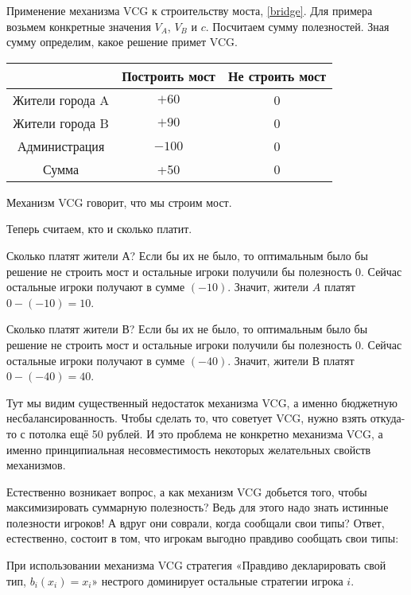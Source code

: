 \begin{myex}
Применение механизма VCG к строительству моста, \ref{bridge}. Для примера возьмем конкретные значения $ V_{A} $, $ V_{B} $ и $ c $. Посчитаем сумму полезностей. Зная сумму определим, какое решение примет VCG.

\begin{tabular}{c|cc}
& Построить мост & Не строить мост \\
\hline
Жители города A & $ +60 $ & 0 \\
Жители города B & $ +90 $ & 0 \\
Администрация & $-100 $ & 0 \\
Сумма & +50 & 0 \\
\end{tabular}

Механизм VCG говорит, что мы строим мост.

Теперь считаем, кто и сколько платит.

Сколько платят жители А? Если бы их не было, то оптимальным было бы решение не строить мост и остальные игроки получили бы полезность 0. Сейчас остальные игроки получают в сумме $ (-10) $. Значит, жители $ A $ платят $ 0-(-10)=10 $.

Сколько платят жители В? Если бы их не было, то оптимальным было бы решение не строить мост и остальные игроки получили бы полезность 0. Сейчас остальные игроки получают в сумме $ (-40) $. Значит, жители В платят $ 0-(-40)=40 $.

Тут мы видим существенный недостаток механизма VCG, а именно бюджетную несбалансированность. Чтобы сделать то, что советует VCG, нужно взять откуда-то с потолка ещё 50 рублей. И это проблема не конкретно механизма VCG, а именно принципиальная несовместимость некоторых желательных свойств механизмов.
\end{myex}

Естественно возникает вопрос, а как механизм VCG добьется того, чтобы максимизировать суммарную полезность? Ведь для этого надо знать истинные полезности игроков! А вдруг они соврали, когда сообщали свои типы? Ответ, естественно, состоит в том, что игрокам выгодно правдиво сообщать свои типы:

\begin{myth}
При использовании механизма VCG стратегия «Правдиво декларировать свой тип, $ b_{i}(x_{i})=x_{i} $» нестрого доминирует остальные стратегии игрока $ i $.
\end{myth}


